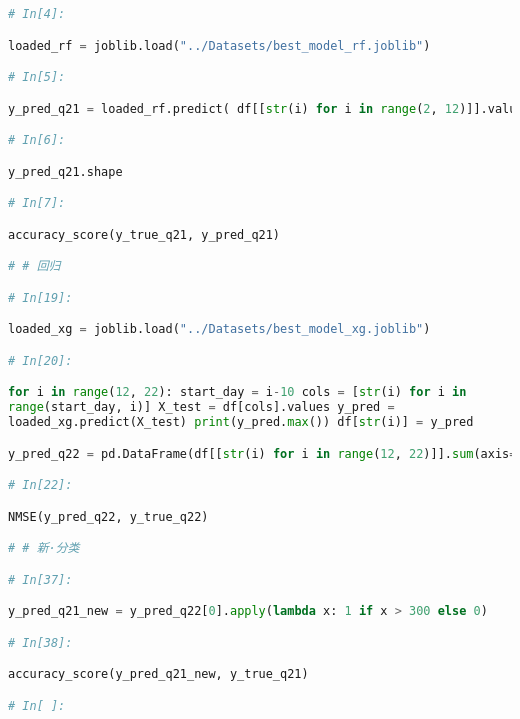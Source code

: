 \documentclass[withoutpreface,bwprint]{cumcmthesis}
\begin{document}
\begin{appendices}
\begin{lstlisting}[language=Python]
# In[4]:

loaded_rf = joblib.load("../Datasets/best_model_rf.joblib")

# In[5]:

y_pred_q21 = loaded_rf.predict( df[[str(i) for i in range(2, 12)]].values )

# In[6]:

y_pred_q21.shape

# In[7]:

accuracy_score(y_true_q21, y_pred_q21)

# # 回归

# In[19]:

loaded_xg = joblib.load("../Datasets/best_model_xg.joblib")

# In[20]:

for i in range(12, 22): start_day = i-10 cols = [str(i) for i in
range(start_day, i)] X_test = df[cols].values y_pred =
loaded_xg.predict(X_test) print(y_pred.max()) df[str(i)] = y_pred

y_pred_q22 = pd.DataFrame(df[[str(i) for i in range(12, 22)]].sum(axis=1)/10)

# In[22]:

NMSE(y_pred_q22, y_true_q22)

# # 新·分类

# In[37]:

y_pred_q21_new = y_pred_q22[0].apply(lambda x: 1 if x > 300 else 0)

# In[38]:

accuracy_score(y_pred_q21_new, y_true_q21)

# In[ ]:



    \end{lstlisting}

\end{appendices}
\end{document}
